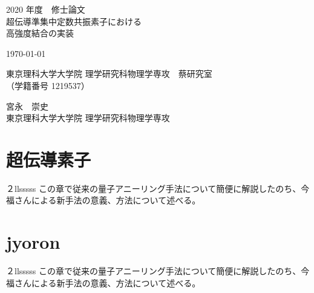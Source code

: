 \documentclass[uplatex,openany,oneside,a4j,11pt]{jsbook}
\begin{document}
\begin{titlepage}
    \begin{center}
        {\Large 2020 年度　修士論文}\\
        \vspace{180truept}
        {\Huge 超伝導準集中定数共振素子における\\
        \vspace{10truept}
        高強度結合の実装}\\ 
        \vspace{70truept}

        {\Large \today}\\

        \vspace{70truept}

        {\Large 東京理科大学大学院 理学研究科物理学専攻　蔡研究室\\
        （学籍番号 1219537）}\\

        \vspace{20truept}

        {\huge 宮永　崇史}\\

        \vspace{160truept}
        {\Large 東京理科大学大学院 理学研究科物理学専攻}\\
    \end{center}
\end{titlepage}

\tableofcontents

\chapter{超伝導素子}
        ２llsssss
        この章で従来の\cite{nakamura1999coherent}量子アニーリング手法について簡便に解説したのち、今福さんによる新手法の意義、方法について述べる。\\
    

\chapter{jyoron}
    ２llsssss
    この章で従来の\cite{nakamura1999coherent}量子アニーリング手法について簡便に解説したのち、今福さんによる新手法の意義、方法について述べる。\\
    
\end{document}
